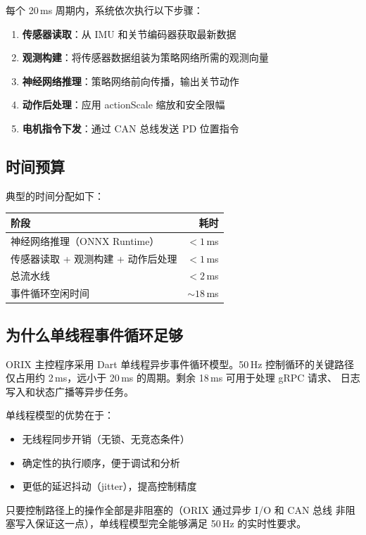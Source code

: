 \documentclass[a4paper,11pt,openany]{book}
\begin{document}
每个 20\,ms 周期内，系统依次执行以下步骤：

\begin{enumerate}[nosep]
  \item \textbf{传感器读取}：从 IMU 和关节编码器获取最新数据
  \item \textbf{观测构建}：将传感器数据组装为策略网络所需的观测向量
  \item \textbf{神经网络推理}：策略网络前向传播，输出关节动作
  \item \textbf{动作后处理}：应用 actionScale 缩放和安全限幅
  \item \textbf{电机指令下发}：通过 CAN 总线发送 PD 位置指令
\end{enumerate}

\subsection{时间预算}

典型的时间分配如下：

\begin{longtable}{lr}
\toprule
阶段 & 耗时 \\
\midrule
神经网络推理（ONNX Runtime） & $< 1$\,ms \\
传感器读取 + 观测构建 + 动作后处理 & $< 1$\,ms \\
总流水线 & $< 2$\,ms \\
事件循环空闲时间 & $\sim 18$\,ms \\
\bottomrule
\end{longtable}

\subsection{为什么单线程事件循环足够}

ORIX 主控程序采用 Dart 单线程异步事件循环模型。50\,Hz 控制循环的关键路径
仅占用约 2\,ms，远小于 20\,ms 的周期。剩余 18\,ms 可用于处理 gRPC 请求、
日志写入和状态广播等异步任务。

单线程模型的优势在于：
\begin{itemize}[nosep]
  \item 无线程同步开销（无锁、无竞态条件）
  \item 确定性的执行顺序，便于调试和分析
  \item 更低的延迟抖动（jitter），提高控制精度
\end{itemize}

只要控制路径上的操作全部是非阻塞的（ORIX 通过异步 I/O 和 CAN 总线
非阻塞写入保证这一点），单线程模型完全能够满足 50\,Hz 的实时性要求。
\end{document}
